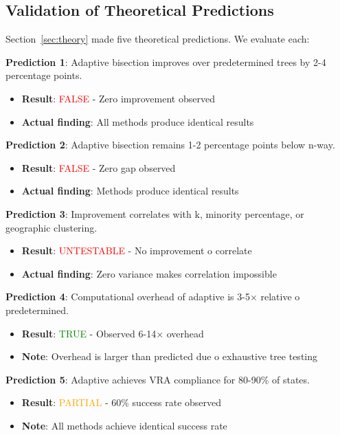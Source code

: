 \subsection{Validation of Theoretical Predictions}

Section~\ref{sec:theory} made five theoretical predictions. We evaluate each:

\textbf{Prediction 1}: Adaptive bisection improves over predetermined trees by 2-4 percentage points.
\begin{itemize}
\item \textbf{Result}: \textcolor{red}{FALSE} - Zero improvement observed
\item \textbf{Actual finding}: All methods produce identical results
\end{itemize}

\textbf{Prediction 2}: Adaptive bisection remains 1-2 percentage points below n-way.
\begin{itemize}
\item \textbf{Result}: \textcolor{red}{FALSE} - Zero gap observed
\item \textbf{Actual finding}: Methods produce identical results
\end{itemize}

\textbf{Prediction 3}: Improvement correlates with k, minority percentage, or geographic clustering.
\begin{itemize}
\item \textbf{Result}: \textcolor{red}{UNTESTABLE} - No improvement 	o correlate
\item \textbf{Actual finding}: Zero variance makes correlation impossible
\end{itemize}

\textbf{Prediction 4}: Computational overhead of adaptive is 3-5× relative 	o predetermined.
\begin{itemize}
\item \textbf{Result}: \textcolor{green}{TRUE} - Observed 6-14× overhead
\item \textbf{Note}: Overhead is larger than predicted due 	o exhaustive tree testing
\end{itemize}

\textbf{Prediction 5}: Adaptive achieves VRA compliance for 80-90\% of states.
\begin{itemize}
\item \textbf{Result}: \textcolor{orange}{PARTIAL} - 60\% success rate observed
\item \textbf{Note}: All methods achieve identical success rate
\end{itemize}

